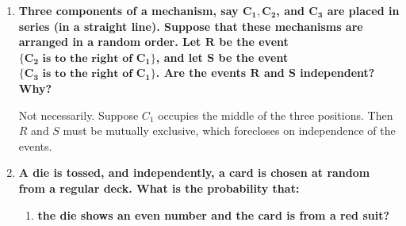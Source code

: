 \documentclass[10pt, oneside]{article}
\begin{document}
\begin{enumerate}[label=3.\arabic*]
	\begin{enumerate}
	\item  \begin{tcolorbox}[
	  colback=Cerulean!5!white,
	  colframe=Cerulean!75!black]
	\textbf{For what choice of $\bm{p}$ are $\bm{A}$ and $\bm{B}$ mutually exclusive?}
	\end{tcolorbox}
	
	If $A$ and $B$ are mutually exclusive, then $P(A \cap B) = 0$. Therefore, $P(B) = P(A \cup B) - P(A) = \boxed{0.3}$.
	
	\item  \begin{tcolorbox}[
	  colback=Cerulean!5!white,
	  colframe=Cerulean!75!black]
	\textbf{For what choice of $\bm{p}$ are $\bm{A}$ and $\bm{B}$ independent?}
	\end{tcolorbox}
	
	If $A$ and $B$ are independent, then $P(A \cap B) = P(A) P(B) \implies P(A \cup B) = P(A) + P(B) - P(A) P(B)$. Then,
	
	\[ 0.7 = 0.4 + p - 0.4p \quad \implies \quad \boxed{p = 0.5} \]
	
	
	\end{enumerate}

\item  \begin{tcolorbox}[
  colback=Cerulean!5!white,
  colframe=Cerulean!75!black]
\textbf{Three components of a mechanism, say $\bm{C_1, C_2}$, and $\bm{C_3}$ are placed in series (in a straight line). Suppose that these mechanisms are arranged in a random order. Let $\bm{R}$ be the event $\bm{\{ C_2 \text{ is to the right of } C_1 \}}$, and let $\bm{S}$ be the event $\bm{\{ C_3 \text{ is to the right of } C_1 \}}$. Are the events $\bm{R}$ and $\bm{S}$ independent? Why?}
\end{tcolorbox}

Not necessarily. Suppose $C_1$ occupies the middle of the three positions. Then $R$ and $S$ must be mutually exclusive, which forecloses on independence of the events.

\item  \begin{tcolorbox}[
  colback=Cerulean!5!white,
  colframe=Cerulean!75!black]
\textbf{A die is tossed, and independently, a card is chosen at random from a regular deck. What is the probability that:}
\end{tcolorbox}

	\begin{enumerate}
	\item  \begin{tcolorbox}[
	  colback=Cerulean!5!white,
	  colframe=Cerulean!75!black]
	\textbf{the die shows an even number and the card is from a red suit?}
	\end{tcolorbox}
	

\end{enumerate}
\end{enumerate}
\end{document}
